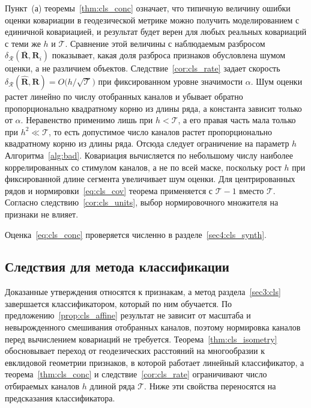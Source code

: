 \begin{remark}
Пункт~(а) теоремы~\ref{thm:cls_conc} означает, что типичную величину ошибки оценки ковариации в геодезической метрике можно получить моделированием с единичной ковариацией, и результат будет верен для любых реальных ковариаций с теми же $h$ и $\mathcal{T}$. Сравнение этой величины с наблюдаемым разбросом $\delta_{\mathcal{R}}(\bar{\mathbf{R}}, \mathbf{R}_i)$ показывает, какая доля разброса признаков обусловлена шумом оценки, а не различием объектов. Следствие~\ref{cor:cls_rate} задает скорость $\delta_{\mathcal{R}}(\hat{\mathbf{R}}, \mathbf{R}) = O\big(h/\sqrt{\mathcal{T}}\big)$ при фиксированном уровне значимости $\alpha$. Шум оценки растет линейно по числу отобранных каналов и убывает обратно пропорционально квадратному корню из длины ряда, а константа зависит только от $\alpha$. Неравенство применимо лишь при $h < \mathcal{T}$, а его правая часть мала только при $h^2 \ll \mathcal{T}$, то есть допустимое число каналов растет пропорционально квадратному корню из длины ряда. Отсюда следует ограничение на параметр $h$ Алгоритма~\ref{alg:bad}. Ковариация вычисляется по небольшому числу наиболее коррелированных со стимулом каналов, а не по всей маске, поскольку рост $h$ при фиксированной длине сегмента увеличивает шум оценки. Для центрированных рядов и нормировки~\eqref{eq:cls_cov} теорема применяется с $\mathcal{T} - 1$ вместо $\mathcal{T}$. Согласно следствию~\ref{cor:cls_units}, выбор нормировочного множителя на признаки не влияет.
\end{remark}

Оценка~\eqref{eq:cls_conc} проверяется численно в разделе~\ref{sec4:cls_synth}.

\subsection{Следствия для метода классификации}\label{sec3:cls_theory_learn}

Доказанные утверждения относятся к признакам, а метод раздела~\ref{sec3:cls} завершается классификатором, который по ним обучается. По предложению~\ref{prop:cls_affine} результат не зависит от масштаба и невырожденного смешивания отобранных каналов, поэтому нормировка каналов перед вычислением ковариаций не требуется. Теорема~\ref{thm:cls_isometry} обосновывает переход от геодезических расстояний на многообразии к евклидовой геометрии признаков, в которой работает линейный классификатор, а теорема~\ref{thm:cls_conc} и следствие~\ref{cor:cls_rate} ограничивают число отбираемых каналов $h$ длиной ряда $\mathcal{T}$. Ниже эти свойства переносятся на предсказания классификатора.

